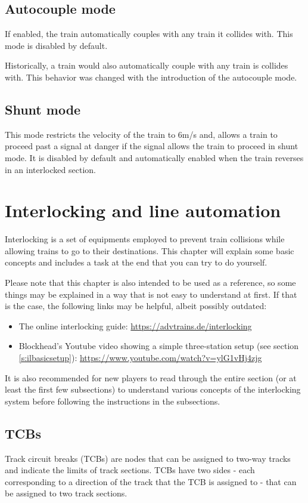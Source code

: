 \documentclass[notitlepage]{article}
\begin{document}
\subsection{Autocouple mode}
If enabled, the train automatically couples with any train it collides with. This mode is disabled by default.

Historically, a train would also automatically couple with any train is collides with. This behavior was changed with the introduction of the autocouple mode.

\subsection{Shunt mode}
This mode restricts the velocity of the train to 6m/s and, allows a train to proceed past a signal at danger if the signal allows the train to proceed in shunt mode. It is disabled by default and automatically enabled when the train reverses in an interlocked section.

\section{Interlocking and line automation}\label{s:interlocking}

Interlocking is a set of equipments employed to prevent train collisions while allowing trains to go to their destinations. This chapter will explain some basic concepts and includes a task at the end that you can try to do yourself.

Please note that this chapter is also intended to be used as a reference, so some things may be explained in a way that is not easy to understand at first. If that is the case, the following links may be helpful, albeit possibly outdated:
\begin{itemize}
\item The online interlocking guide: \url{https://advtrains.de/interlocking}
\item Blockhead's Youtube video showing a simple three-station setup (see section \ref{s:ilbasicsetup}): \url{https://www.youtube.com/watch?v=ylG1vHj4zjg}
\end{itemize}

It is also recommended for new players to read through the entire section (or at least the first few subsections) to understand various concepts of the interlocking system before following the instructions in the subsections.

\subsection{TCBs}\label{s:iltcbs}
Track circuit breaks (TCBs) are nodes that can be assigned to two-way tracks and indicate the limits of track sections. TCBs have two sides - each corresponding to a direction of the track that the TCB is assigned to - that can be assigned to two track sections.
\end{document}
